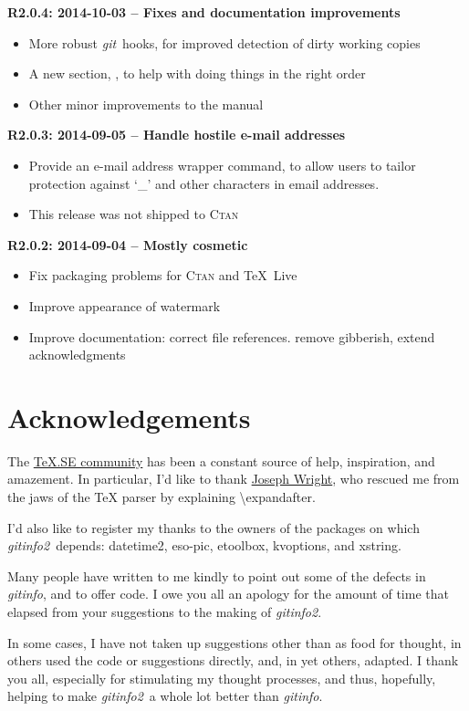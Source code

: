 \documentclass[a4paper,12pt,twoside,openany]{memoir}
\newcommand{\rpara}[1]{\par\noindent\textbf{#1}\,}
\newcommand{\sfit}[1]{\textit{#1}}
\newcommand{\git}{\sfit{git}}
\newcommand{\opname}{\sfit{gitinfo}}
\newcommand{\tpname}{\sfit{gitinfo2}}
\begin{document}
\rpara{R2.0.4: 2014-10-03 -- Fixes and documentation improvements}
\begin{itemize}
\item More robust \git\ hooks,
for improved detection of dirty working copies
\item A new section, \textit{},
to help with doing things in the right order
\item Other minor improvements to the manual
\end{itemize}

\rpara{R2.0.3: 2014-09-05 -- Handle hostile e-mail addresses}
\begin{itemize}
\item Provide an e-mail address wrapper command,
to allow users to tailor protection
against `\_' and other characters in email addresses.
\item This release was not shipped to \textsc{Ctan}
\end{itemize}

\rpara{R2.0.2: 2014-09-04 -- Mostly cosmetic}
\begin{itemize}
\item Fix packaging problems for \textsc{Ctan} and \TeX{}~Live
\item Improve appearance of watermark
\item Improve documentation: correct file references. remove gibberish, extend acknowledgments
\end{itemize}

\clearpage
\section{Acknowledgements}

The \href{http://tex.stackexchange.com}{\TeX.SE community}
has been a constant source of help, inspiration, and amazement.
In particular, I'd like to thank
\href{http://tex.stackexchange.com/users/73/joseph-wright}{Joseph Wright},
who rescued me from the jaws of the TeX parser by explaining
\textbackslash expandafter.

I'd also like to register my thanks to the owners of the packages on which
\tpname\ depends: datetime2, eso-pic, etoolbox, kvoptions, and xstring.

Many people have written to me kindly
to point out some of the defects in \opname, and to offer code.
I owe you all an apology for the amount of time that elapsed
from your suggestions to the making of \tpname.

In some cases, I have not taken up suggestions other than as food for thought,
in others used the code or suggestions directly, and,
in yet others, adapted.
I thank you all, especially for stimulating my thought processes,
and thus, hopefully,
helping to make \tpname\ a whole lot better than \opname.
\end{document}

